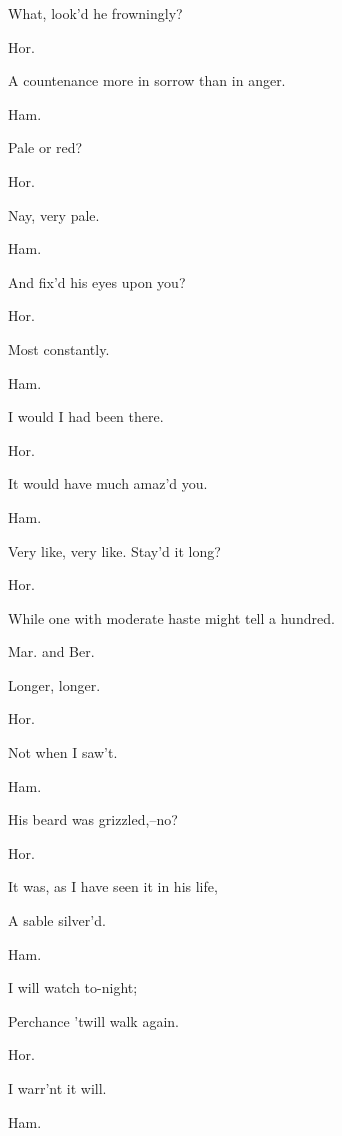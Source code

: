 \documentclass[12pt]{book}
\begin{document}
What, look'd he frowningly?



Hor.

A countenance more in sorrow than in anger.



Ham.

Pale or red?



Hor.

Nay, very pale.



Ham.

And fix'd his eyes upon you?



Hor.

Most constantly.



Ham.

I would I had been there.



Hor.

It would have much amaz'd you.



Ham.

Very like, very like. Stay'd it long?



Hor.

While one with moderate haste might tell a hundred.



Mar. and Ber.

Longer, longer.



Hor.

Not when I saw't.



Ham.

His beard was grizzled,--no?



Hor.

It was, as I have seen it in his life,

A sable silver'd.



Ham.

I will watch to-night;

Perchance 'twill walk again.



Hor.

I warr'nt it will.



Ham.
\end{document}
